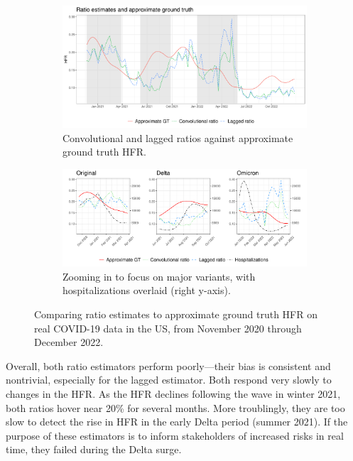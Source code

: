 \documentclass{article}
\begin{document}
\begin{figure}[t!]
\centering
\begin{subfigure}[b]{\linewidth} 
  \centering
  \includegraphics[width=\linewidth]{Figures/Real/US_ests_realtime.pdf}
  \caption{Convolutional and lagged ratios against approximate ground truth
    HFR.} 
\end{subfigure}

\bigskip
\begin{subfigure}[b]{\linewidth}
  \centering
  \includegraphics[width=\linewidth]{Figures/Real/hfrs_by_wave.pdf}
  \caption{Zooming in to focus on major variants, with hospitalizations overlaid
    (right y-axis).}
\end{subfigure}

\caption{Comparing ratio estimates to approximate ground truth HFR on real
  COVID-19 data in the US, from November 2020 through December 2022.}
\label{fig:basic_est_vs_gt_figs}
\end{figure}

Overall, both ratio estimators perform poorly---their bias is consistent and 
nontrivial, especially for the lagged estimator. Both respond very slowly to
changes in the HFR. As the HFR declines following the wave in winter 2021, both   
ratios hover near 20\% for several months. More troublingly, they are too slow
to detect the rise in HFR in the early Delta period (summer 2021). If the
purpose of these estimators is to inform stakeholders of increased risks in real
time, they failed during the Delta surge.  
\end{document}

